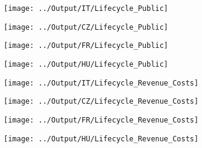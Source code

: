 \documentclass[12pt,notitlepage]{article}
\begin{document}
\begin{figure}[!htpb]
\centering
\caption{Distribution of Public Firms across age}
\begin{subfigure}{.49\textwidth}
    \centering
 \texttt{[image: ../Output/IT/Lifecycle\_Public]}
\end{subfigure}%
\begin{subfigure}{.49\textwidth}
    \centering
 \texttt{[image: ../Output/CZ/Lifecycle\_Public]}
\end{subfigure}
\begin{subfigure}{.49\textwidth}
    \centering
 \texttt{[image: ../Output/FR/Lifecycle\_Public]}
\end{subfigure}%
\begin{subfigure}{.49\textwidth}
    \centering
 \texttt{[image: ../Output/HU/Lifecycle\_Public]}
\end{subfigure}
\end{figure}
\pagebreak

\begin{figure}[!htpb]
\centering
\caption{Firm age and Revenue/Costs}
\begin{subfigure}{.49\textwidth}
    \centering
 \texttt{[image: ../Output/IT/Lifecycle\_Revenue\_Costs]}
\end{subfigure}%
\begin{subfigure}{.49\textwidth}
    \centering
 \texttt{[image: ../Output/CZ/Lifecycle\_Revenue\_Costs]}
\end{subfigure}
\begin{subfigure}{.49\textwidth}
    \centering
 \texttt{[image: ../Output/FR/Lifecycle\_Revenue\_Costs]}
\end{subfigure}%
\begin{subfigure}{.49\textwidth}
    \centering
 \texttt{[image: ../Output/HU/Lifecycle\_Revenue\_Costs]}
\end{subfigure}
\end{figure}
\pagebreak
\end{document}
